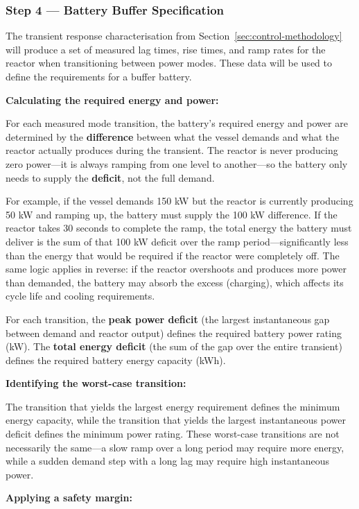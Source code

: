 \documentclass[12pt]{article}
\begin{document}
\subsubsection*{Step 4 — Battery Buffer Specification}

The transient response characterisation from Section~\ref{sec:control-methodology} will produce a set of measured lag times, rise times, and ramp rates for the reactor when transitioning between power modes. These data will be used to define the requirements for a buffer battery.

\textbf{Calculating the required energy and power:}

For each measured mode transition, the battery's required energy and power are determined by the \textbf{difference} between what the vessel demands and what the reactor actually produces during the transient. The reactor is never producing zero power—it is always ramping from one level to another—so the battery only needs to supply the \textbf{deficit}, not the full demand.

For example, if the vessel demands 150 kW but the reactor is currently producing 50 kW and ramping up, the battery must supply the 100 kW difference. If the reactor takes 30 seconds to complete the ramp, the total energy the battery must deliver is the sum of that 100 kW deficit over the ramp period—significantly less than the energy that would be required if the reactor were completely off. The same logic applies in reverse: if the reactor overshoots and produces more power than demanded, the battery may absorb the excess (charging), which affects its cycle life and cooling requirements.

For each transition, the \textbf{peak power deficit} (the largest instantaneous gap between demand and reactor output) defines the required battery power rating (kW). The \textbf{total energy deficit} (the sum of the gap over the entire transient) defines the required battery energy capacity (kWh).

\textbf{Identifying the worst-case transition:}

The transition that yields the largest energy requirement defines the minimum energy capacity, while the transition that yields the largest instantaneous power deficit defines the minimum power rating. These worst-case transitions are not necessarily the same—a slow ramp over a long period may require more energy, while a sudden demand step with a long lag may require high instantaneous power.

\textbf{Applying a safety margin:}
\end{document}
